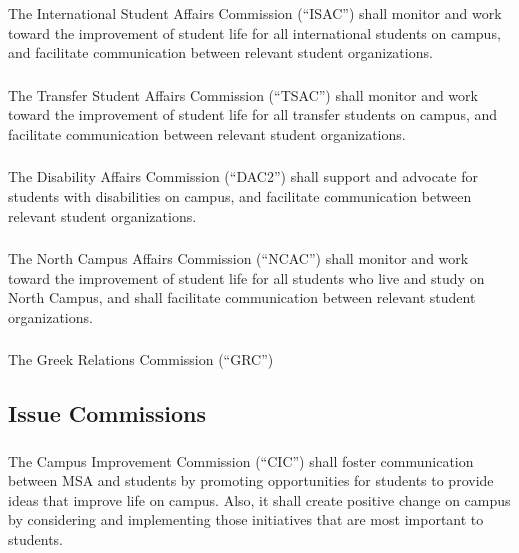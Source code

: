 \subsubsection{}
The International Student Affairs Commission (``ISAC'') shall monitor and work toward the improvement of student life for all international students on campus, and facilitate communication between relevant student organizations.

\subsubsection{}
The Transfer Student Affairs Commission (``TSAC'') shall monitor and work toward the improvement of student life for all transfer students on campus, and facilitate communication between relevant student organizations.

\subsubsection{}
The Disability Affairs Commission (``DAC2'') shall support and advocate for students with disabilities on campus, and facilitate communication between relevant student organizations.

\subsubsection{}
The North Campus Affairs Commission (``NCAC'') shall monitor and work toward the improvement of student life for all students who live and study on North Campus, and shall facilitate communication between relevant student organizations.

\subsubsection{}
The Greek Relations Commission (``GRC'')


\subsection{Issue Commissions}

\subsubsection{}
The Campus Improvement Commission (``CIC'') shall foster communication between MSA and students by promoting opportunities for students to provide ideas that improve life on campus. Also, it shall create positive change on campus by considering and implementing those initiatives that are most important to students.

